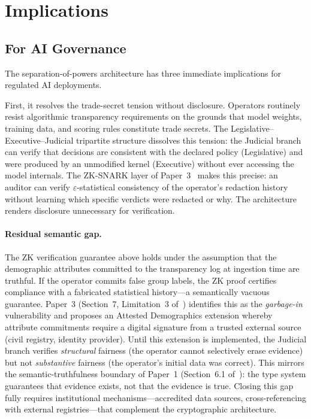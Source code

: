 
\section{Implications}
\label{sec:implications}

\subsection{For AI Governance}

The separation-of-powers architecture has three immediate implications
for regulated AI deployments.

First, it resolves the trade-secret tension without disclosure.
Operators routinely resist algorithmic transparency requirements on
the grounds that model weights, training data, and scoring rules
constitute trade secrets. The Legislative--Executive--Judicial
tripartite structure dissolves this tension: the Judicial branch can
verify that decisions are consistent with the declared policy
(Legislative) and were produced by an unmodified kernel (Executive)
without ever accessing the model internals. The ZK-SNARK layer of
Paper~3~\cite{btv-ar2026} makes this precise: an auditor can verify
$\varepsilon$-statistical consistency of the operator's redaction
history without learning which specific verdicts were redacted or why.
The architecture renders disclosure unnecessary for verification.

\paragraph{Residual semantic gap.}
The ZK verification guarantee above holds under the assumption that
the demographic attributes committed to the transparency log at
ingestion time are truthful. If the operator commits false group
labels, the ZK proof certifies compliance with a fabricated
statistical history---a semantically vacuous guarantee. Paper~3
(Section~7, Limitation~3 of~\cite{btv-ar2026}) identifies this as
the \emph{garbage-in} vulnerability and proposes an Attested
Demographics extension whereby attribute commitments require a
digital signature from a trusted external source (civil registry,
identity provider). Until this extension is implemented, the
Judicial branch verifies \emph{structural} fairness (the operator
cannot selectively erase evidence) but not \emph{substantive}
fairness (the operator's initial data was correct). This mirrors
the semantic-truthfulness boundary of Paper~1
(Section~6.1 of~\cite{btv2026}): the type system guarantees
that evidence exists, not that the evidence is true. Closing this
gap fully requires institutional mechanisms---accredited data
sources, cross-referencing with external registries---that
complement the cryptographic architecture.

